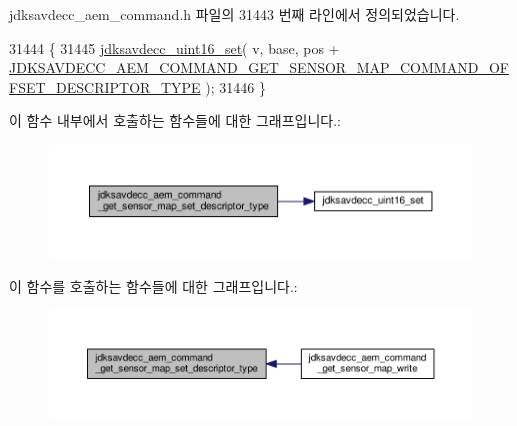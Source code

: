 jdksavdecc\+\_\+aem\+\_\+command.\+h 파일의 31443 번째 라인에서 정의되었습니다.


\begin{DoxyCode}
31444 \{
31445     \hyperlink{group__endian_ga14b9eeadc05f94334096c127c955a60b}{jdksavdecc\_uint16\_set}( v, base, pos + 
      \hyperlink{group__command__get__sensor__map_ga2f5606b426b7e84a3dd6a1b39341af38}{JDKSAVDECC\_AEM\_COMMAND\_GET\_SENSOR\_MAP\_COMMAND\_OFFSET\_DESCRIPTOR\_TYPE}
       );
31446 \}
\end{DoxyCode}


이 함수 내부에서 호출하는 함수들에 대한 그래프입니다.\+:
\nopagebreak
\begin{figure}[H]
\begin{center}
\leavevmode
\includegraphics[width=350pt]{group__command__get__sensor__map_ga5f1c64dbe865a4f9e798077894c5fd6c_cgraph}
\end{center}
\end{figure}




이 함수를 호출하는 함수들에 대한 그래프입니다.\+:
\nopagebreak
\begin{figure}[H]
\begin{center}
\leavevmode
\includegraphics[width=350pt]{group__command__get__sensor__map_ga5f1c64dbe865a4f9e798077894c5fd6c_icgraph}
\end{center}
\end{figure}


